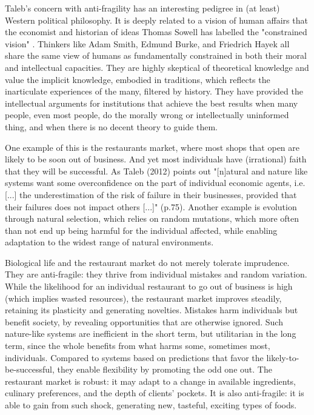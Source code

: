 \documentclass[conference]{IEEEtran}
\begin{document}
Taleb's concern with anti-fragility has an interesting pedigree in (at least) Western political philosophy. It is deeply related to a vision of human affairs that the economist and historian of ideas Thomas Sowell has labelled the "constrained vision"  \cite{Sowell:Conflict:2007,Murphy:Unconstrained:2015}. Thinkers like Adam Smith, Edmund Burke, and Friedrich Hayek all share the same view of humans as fundamentally constrained in both their moral and intellectual capacities. They are highly skeptical of theoretical knowledge and value the implicit knowledge, embodied in traditions, which reflects the inarticulate experiences of the many, filtered by history. They have provided the intellectual arguments for institutions that achieve the best results when many people, even most people, do the morally wrong or intellectually uninformed thing, and when there is no decent theory to guide them. 

One example of this is the restaurants market, where most shops that open are likely to be soon out of business. And yet most individuals have (irrational) faith that they will be successful. As Taleb (2012) \cite{Taleb:Antifragility:2012} points out "[n]atural and nature like systems want some overconfidence on the part of individual economic agents, i.e. [...] the underestimation of the risk of failure in their businesses, provided that their failures does not impact others [...]" (p.75). Another example is evolution through natural selection, which relies on random mutations, which more often than not end up being harmful for the individual affected, while enabling adaptation to the widest range of natural environments. 

Biological life and the restaurant market do not merely tolerate imprudence. They are anti-fragile: they thrive from individual mistakes and random variation. While the likelihood for an individual restaurant to go out of business is high (which implies wasted resources), the restaurant market improves steadily, retaining its plasticity and generating novelties. Mistakes harm individuals but benefit society, by revealing opportunities that are otherwise ignored. Such nature-like systems are inefficient in the short term, but utilitarian in the long term, since the whole benefits from what harms some, sometimes most, individuals. Compared to systems based on predictions that favor the likely-to-be-successful, they enable flexibility by promoting the odd one out. The restaurant market is robust: it may adapt to a change in available ingredients, culinary preferences, and the depth of clients' pockets. It is also anti-fragile: it is able to gain from such shock, generating new, tasteful, exciting types of foods. 
\end{document}
